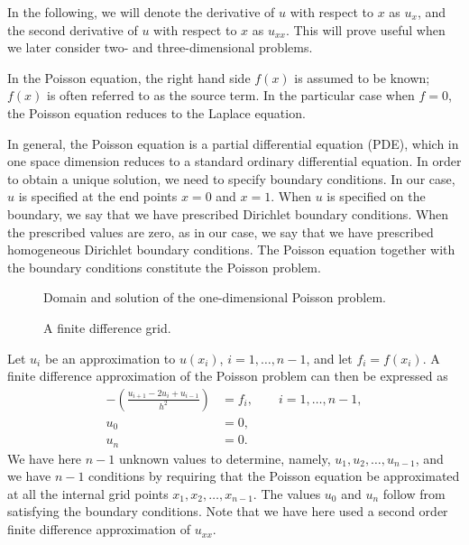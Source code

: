 In the following, we will denote the derivative of $u$ with respect to $x$ as
$u_x$, and the second derivative of $u$ with respect to $x$ as $u_{xx}$. This
will prove useful when we later consider two- and three-dimensional problems.

In the Poisson equation, the right hand side $f(x)$ is assumed to be known;
$f(x)$ is often referred to as the source term. In the particular case when
$f=0$, the Poisson equation reduces to the Laplace equation.

In general, the Poisson equation is a partial differential equation (PDE), which
in one space dimension reduces to a standard ordinary differential equation. In
order to obtain a unique solution, we need to specify boundary conditions. In
our case, $u$ is specified at the end points $x=0$ and $x=1$. When $u$ is
specified on the boundary, we say that we have prescribed Dirichlet boundary
conditions. When the prescribed values are zero, as in our case, we say that we
have prescribed homogeneous Dirichlet boundary conditions. The Poisson equation
together with the boundary conditions constitute the Poisson problem.

\begin{figure}
  \centering
  
  \caption{Domain and solution of the one-dimensional Poisson problem.}
  \label{fig:Poisson1D_Domain}
\end{figure}

\begin{figure}
  \centering
  
  \caption{A finite difference grid.}
  \label{fig:Poisson1D_Grid}
\end{figure}

Let $u_i$ be an approximation to $u(x_i)$, $i=1,\ldots,n-1$, and let $f_i =
f(x_i)$. A finite difference approximation of the Poisson problem can then be
expressed as
\begin{align}
  -\left( \frac{u_{i+1} - 2u_i + u_{i-1}}{h^2} \right) &= f_i, \qquad i=1,\ldots,n-1,
  \label{eq:Poisson_int_1d}\\
  u_0 &= 0, \\
  u_{n} &= 0.
\end{align}
We have here $n-1$ unknown values to determine, namely, $u_1, u_2, \ldots,
u_{n-1}$, and we have $n-1$ conditions by requiring that the Poisson equation be
approximated at all the internal grid points $x_1, x_2, \ldots,x_{n-1}$. The
values $u_0$ and $u_{n}$ follow from satisfying the boundary conditions. Note
that we have here used a second order finite difference approximation of
$u_{xx}$.

